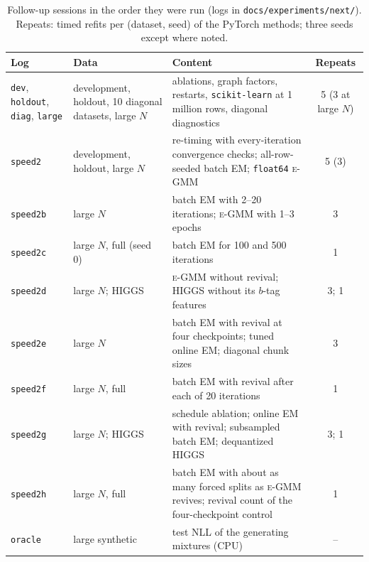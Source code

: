 \documentclass[10pt]{article} %
\newcommand{\egmm}{\textsc{e-GMM}}
\begin{document}
\begin{table}[htbp]
\centering
\caption{Follow-up sessions in the order they were run (logs in \texttt{docs/experiments/next/}). Repeats: timed refits per (dataset, seed) of the PyTorch methods; three seeds except where noted.}
\label{tab:sessions}
\small
\begin{tabular}{>{\raggedright\arraybackslash}p{2.2cm}>{\raggedright\arraybackslash}p{3.1cm}>{\raggedright\arraybackslash}p{6.9cm}c}
\toprule
\textbf{Log} & \textbf{Data} & \textbf{Content} & \textbf{Repeats} \\
\midrule
\texttt{dev}, \texttt{holdout}, \texttt{diag}, \texttt{large} & development, holdout, 10 diagonal datasets, large $N$ & ablations, graph factors, restarts, \texttt{scikit-learn} at 1 million rows, diagonal diagnostics & 5 (3 at large $N$) \\
\texttt{speed2} & development, holdout, large $N$ & re-timing with every-iteration convergence checks; all-row-seeded batch EM; \texttt{float64} \egmm{} & 5 (3) \\
\texttt{speed2b} & large $N$ & batch EM with 2--20 iterations; \egmm{} with 1--3 epochs & 3 \\
\texttt{speed2c} & large $N$, full (seed 0) & batch EM for 100 and 500 iterations & 1 \\
\texttt{speed2d} & large $N$; HIGGS & \egmm{} without revival; HIGGS without its $b$-tag features & 3; 1 \\
\texttt{speed2e} & large $N$ & batch EM with revival at four checkpoints; tuned online EM; diagonal chunk sizes & 3 \\
\texttt{speed2f} & large $N$, full & batch EM with revival after each of 20 iterations & 1 \\
\texttt{speed2g} & large $N$; HIGGS & schedule ablation; online EM with revival; subsampled batch EM; dequantized HIGGS & 3; 1 \\
\texttt{speed2h} & large $N$, full & batch EM with about as many forced splits as \egmm{} revives; revival count of the four-checkpoint control & 1 \\
\texttt{oracle} & large synthetic & test NLL of the generating mixtures (CPU) & -- \\
\bottomrule
\end{tabular}
\end{table}
\end{document}
